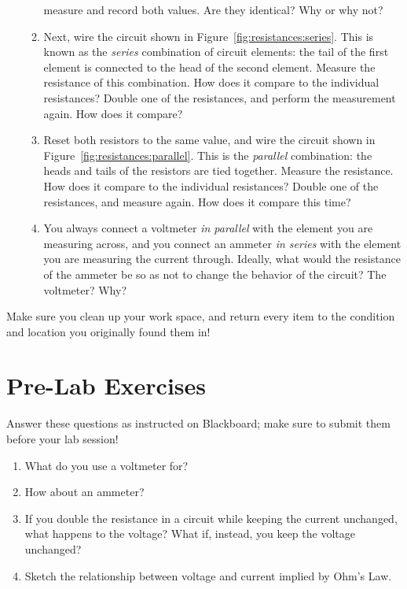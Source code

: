 \documentclass[12pt]{article}
\begin{document}
\begin{enumerate}
\begin{enumerate}
    measure and record both values.  Are they identical?  Why or why
    not?
  \item \label{item:series} Next, wire the circuit shown in
    Figure~\ref{fig:resistances:series}.  This is known as the
    \textit{series} combination of circuit elements: the tail of the
    first element is connected to the head of the second element.
    Measure the resistance of this combination.  How does it compare
    to the individual resistances?  Double one of the resistances, and
    perform the measurement again.  How does it compare?
  \item \label{item:parallel} Reset both resistors to the same value,
    and wire the circuit shown in
    Figure~\ref{fig:resistances:parallel}.  This is the
    \textit{parallel} combination: the heads and tails of the
    resistors are tied together.  Measure the resistance.  How does it
    compare to the individual resistances?  Double one of the
    resistances, and measure again.  How does it compare this time?
  \item You always connect a voltmeter \textit{in parallel} with the
    element you are measuring across, and you connect an ammeter
    \textit{in series} with the element you are measuring the current
    through.  Ideally, what would the resistance of the ammeter be so
    as not to change the behavior of the circuit?  The voltmeter?
    Why? 
  \end{enumerate}
\end{enumerate}

Make sure you clean up your work space, and return every item to the
condition and location you originally found them in!

\newpage

\section*{Pre-Lab Exercises}

Answer these questions as instructed on Blackboard; make sure to
submit them before your lab session!

\begin{enumerate}
\item What do you use a voltmeter for?
\item How about an ammeter?
\item If you double the resistance in a circuit while keeping the
  current unchanged, what happens to the voltage?  What if, instead,
  you keep the voltage unchanged?
\item Sketch the relationship between voltage and current implied by
  Ohm's Law.
\end{enumerate}
\end{document}
